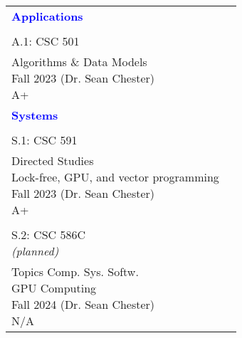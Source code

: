 \documentclass{article}
\begin{document}
\begin{table}[htb]
\begin{tabularx}{\textwidth}[t]{XX}
\arrayrulecolor{mygray}\hline
\arrayrulecolor{blue}\hline
\rowcolor{lightBlue} \textbf{\textcolor{blue}{Applications}} & \\
\arrayrulecolor{mygray}\hline
\arrayrulecolor{blue}\hline

\makecell{%
~\\
\parbox{\linewidth}{%
A.1: CSC 501
}\\
~\\
}& 
\makecell{%
~\\
\parbox{\linewidth}{%
Algorithms \& Data Models\\
Fall 2023 (Dr. Sean Chester)\\
A+
}\\
~\\
}\\


\arrayrulecolor{mygray}\hline
\arrayrulecolor{blue}\hline
\rowcolor{lightBlue} \textbf{\textcolor{blue}{Systems}} & \\
\arrayrulecolor{mygray}\hline
\arrayrulecolor{blue}\hline

\makecell{%
~\\
\parbox{\linewidth}{%
S.1: CSC 591
}\\
~\\
}& 
\makecell{%
~\\
\parbox{\linewidth}{%
Directed Studies\\
Lock-free, GPU, and vector programming\\
Fall 2023 (Dr. Sean Chester)\\
A+
}\\
~\\
}\\

\arrayrulecolor{mygray}\hline

\makecell{%
~\\
\parbox{\linewidth}{%
S.2: CSC 586C\\
{\em (planned)}
}\\
~\\
}& 
\makecell{%
~\\
\parbox{\linewidth}{%
Topics Comp. Sys. Softw.\\
GPU Computing\\
Fall 2024 (Dr. Sean Chester)\\
N/A
}\\
~\\
}\\



\end{tabularx}
\end{table}
\end{document}

